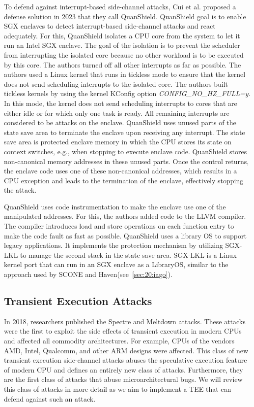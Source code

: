To defend against interrupt-based side-channel attacks, Cui et al. proposed a defense solution in 2023 that they call
QuanShield.\cite{cui_quanshield_2023} QuanShield goal is to enable SGX enclaves to detect interrupt-based side-channel
attacks and react adequately. For this, QuanShield isolates a CPU core from the system to let it run
an Intel SGX enclave. The goal of the isolation is to prevent the scheduler from interrupting the isolated core because
no other workload is to be executed by this core. The authors turned off all other interrupts as far as possible. The
authors used a Linux kernel that runs in tickless mode to ensure that the kernel does not send scheduling interrupts to
the isolated core. The authors built tickless kernels by using the kernel KConfig option
\textit{CONFIG\_NO\_HZ\_FULL=y}. In this mode, the kernel does not send scheduling interrupts to cores that are either
idle or for which only one task is ready.\cite{linuxtickless} All remaining interrupts are considered to be attacks on the enclave.
QuanShield uses unused parts of the state save area to terminate the enclave upon receiving any interrupt. The state
save area is protected enclave memory in which the CPU stores its state on context switches, e.g., when stopping to
execute enclave code. QuanShield stores non-canonical memory addresses in these unused parts. Once the control returns,
the enclave code uses one of these non-canonical addresses, which results in a CPU exception and leads to the
termination of the enclave, effectively stopping the attack.

QuanShield uses code instrumentation to make the enclave use one of the manipulated addresses. For this, the authors
added code to the LLVM compiler. The compiler introduces load and store operations on each function entry to make the
code fault as fast as possible. QuanShield uses a library OS to support legacy applications. It implements the
protection mechanism by utilizing SGX-LKL to manage the second stack in the state save area. SGX-LKL is a Linux kernel
port that can run in an SGX enclave as a LibraryOS, similar to the approach used by SCONE and
Haven(see~\ref{sec:20:iago}).\cite{priebe2019sgx}

\subsection{Transient Execution Attacks}
\label{sec:20:transientattacks}
In 2018, researchers published the Spectre and Meltdown attacks.\cite{kocher_spectre_2020, lipp_meltdown_2020}
These attacks were the first to exploit the side effects of transient execution in modern CPUs and affected all commodity
architectures. For example, CPUs of the vendors AMD, Intel, Qualcomm, and other ARM designs were affected. This class of
new transient execution side-channel attacks abuses the speculative execution feature of modern CPU and defines an entirely
new class of attacks. Furthermore, they are the first class of attacks that abuse microarchitectural bugs. We will review
this class of attacks in more detail as we aim to implement a TEE that can defend against such an attack.

